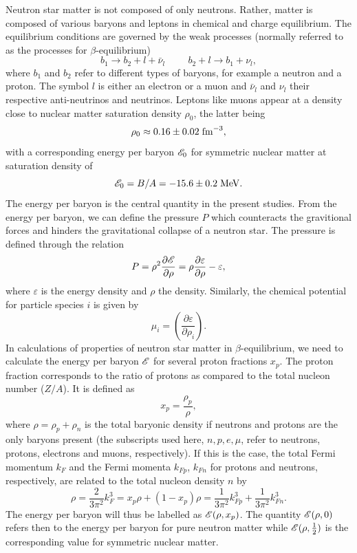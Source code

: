 Neutron star matter is not composed of only neutrons. Rather, matter
is composed of various baryons and leptons in chemical and charge
equilibrium.  The equilibrium conditions are governed by the weak
processes (normally referred to as the processes for
$\beta$-equilibrium)
\begin{equation} 
      b_1 \rightarrow b_2 + l +\bar{\nu}_l \hspace{1cm} b_2 +l
      \rightarrow b_1 +\nu_l,
      \label{eq:betadecay}
\end{equation}
where $b_1$ and $b_2$ refer to different types of baryons, for example
a neutron and a proton.  The symbol $l$ is either an electron or a
muon and $\bar{\nu}_l $ and $\nu_l$ their respective anti-neutrinos
and neutrinos. Leptons like muons appear at a density close to nuclear
matter saturation density $\rho_0$, the latter being
\[
     \rho_0 \approx 0.16 \pm 0.02 \hspace{0.1cm} \mathrm{fm}^{-3},
\]
with a corresponding energy per baryon ${\cal E}_0$ for symmetric
nuclear matter at saturation density of
\[
     {\cal E}_0 = B/A=-15.6\pm 0.2 \hspace{0.1cm} \mathrm{MeV}.
\]
The energy per baryon is the central quantity in the present
studies. From the energy per baryon, we can define the pressure $P$
which counteracts the gravitional forces and hinders the gravitational
collapse of a neutron star. The pressure is defined through the
relation
\[
    P=\rho^2\frac{\partial {\cal E}}{\partial \rho}= \rho\frac{\partial
      \varepsilon}{\partial \rho}-\varepsilon,
\]
where $\varepsilon$ is the energy density and $\rho$ the density.  Similarly, the chemical
potential for particle species $i$ is given by
\[
     \mu_i = \left(\frac{\partial \varepsilon}{\partial \rho_i}\right).
\]
In calculations of properties of neutron star matter in
$\beta$-equilibrium, we need to calculate the energy per baryon ${\cal E}$ 
for several proton fractions $x_p$. The proton fraction
corresponds to the ratio of protons as compared to the total nucleon
number ($Z/A$). It is defined as
\[
    x_p = \frac{\rho_p}{\rho},
\]
where $\rho=\rho_p+\rho_n$ is the total baryonic density if neutrons and
protons are the only baryons present (the subscripts used here,
$n,p,e,\mu$, refer to neutrons, protons, electrons and
muons, respectively).
If this is the case, the total
Fermi momentum $k_F$ and the Fermi momenta $k_{Fp}$, $k_{Fn}$ for
protons and neutrons, respectively, are related to the total nucleon density $n$ by
\[
     \rho = \frac{2}{3\pi^2} k_F^3 = x_p \rho + (1-x_p) \rho= \frac{1}{3\pi^2} k_{Fp}^3 + \frac{1}{3\pi^2}k_{Fn}^3.
\]
The energy per baryon will thus be labelled as ${\cal E}(\rho,x_p)$. The
quantity ${\cal E}(\rho,0)$ refers then to the energy per baryon for pure
neutron matter while ${\cal E}(\rho,\frac{1}{2})$ is the
corresponding value for symmetric nuclear matter. 

